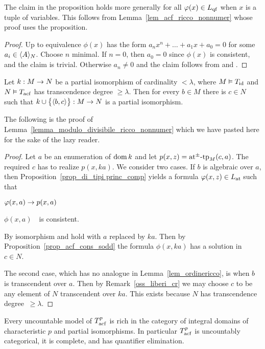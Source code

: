 \documentclass[creche.tex]{subfiles}
\begin{document}
The claim in the proposition holds more generally for all $\phi(x)\in L_{\rm qf}$ when $x$ is a tuple of variables. This follows from Lemma~\ref{lem_acf_ricco_nonnumer} whose proof uses the proposition.

\begin{proof}
Up to equivalence $\phi(x)$ has the form $a_nx^n + \dots + a_1 x + a_0=0$ for some $a_i\in\<A\>_N$. Choose $n$ minimal. If $n=0$, then $a_0=0$ since $\phi(x)$ is consistent, and the claim is trivial. Otherwise $a_n\neq0$ and the claim follows from  and . 
\end{proof}

\begin{lemma}\label{lem_acf_ricco_nonnumer}
Let $k:M\imp N$ be a partial isomorphism of cardinality $<\lambda$, where $M\models T_{\rm id}$ and $N\models T_{\rm acf}$ has transcendence degree $\ge\lambda$. Then for every $b\in M$ there is $c\in N$ such that $k\cup\big\{\<b,c\>\big\}:M\imp N$ is a partial isomorphism.
\end{lemma}

The following is the proof of Lemma~\ref{lemma_modulo_divisibile_ricco_nonnumer} which we have pasted here for the sake of the lazy reader.

\begin{proof}
Let $a$ be an enumeration of $\dom k$ and let $p(x,z)=\atpmtp_M(c,a)$. The required $c$ has to realize $p(x,ka)$. We consider two cases. If $b$ is algebraic over $a$, then Proposition~\ref{prop_di_tipi princ_comp} yields a formula $\phi(x,z)\in\atL$ such that 

\noindent{}\hspace{5ex} $\phi(x,a)\imp p(x,a)$

\noindent{}\hspace{5ex} $\phi(x,a)$\ \ is consistent.

By isomorphism  and  hold with $a$ replaced by $ka$. Then by Proposition~\ref{prop_acf_cons_sodd} the formula $\phi(x,ka)$ has a solution in $c\in N$.

The second case, which has no analogue in Lemma~\ref{lem_ordinericco}, is when $b$ is transcendent over $a$. Then by  Remark~\ref{oss_liberi_cr} we may choose $c$ to be any element of $N$ transcendent over $ka$. This exists because $N$ has transcendence degree $\ \ge\lambda$. 
\end{proof}

\begin{corollary}\label{corol_acfUltraOmog}
Every uncountable model of $T^p_{\rm acf}$ is rich in the category of integral domains of characteristic $p$ and partial isomorphisms. In particular $T^p_{\rm acf}$ is uncountably categorical, it is complete, and has quantifier elimination.
\end{corollary}
\end{document}
